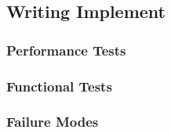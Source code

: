 
\subsection{Writing Implement}
\label{sec:verification_writing_implement}

\subsubsection{Performance Tests}
\label{sec:writing_pt}

\subsubsection{Functional Tests}
\label{sec:writing_ft}

\subsubsection{Failure Modes}
\label{sec:writing_fm}